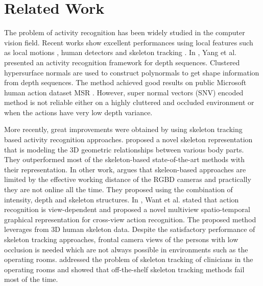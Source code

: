 
\chapter{Related Work} %

\label{Chapter2} %



	The problem of activity recognition has been widely studied in the computer vision field. Recent works show excellent performances using local features such as local motions \cite{5995407, 6909503}, human detectors \cite{Klaser:2010:HFA:2435051.2435071} and skeleton tracking \cite{6909731, 6909476, 6909493}. In \cite{6909503}, Yang et al. presented an activity recognition framework for depth sequences. Clustered hypersurface normals are used to construct polynormals to get shape information from depth sequences. The method achieved good results on public Microsoft human action dataset MSR \cite{MSR:5543273, MSR:6618942, MSR:Wang:2012:RAR:2403006.2403071, MSR:6247813}. However, super normal vectors (SNV) encoded method is not reliable either on a highly cluttered and occluded environment or when the actions have very low depth variance.

	More recently, great improvements were obtained by using skeleton tracking based activity recognition approaches. \citet{6909476} proposed a novel skeleton representation that is modeling the 3D geometric relationships between various body parts. They outperformed most of the skeleton-based state-of-the-art methods with their representation. In other work, \citet{6909731} argues that skeleon-based approaches are limited by the effective working distance of the RGBD cameras and practically they are not online all the time. They proposed using the combination of intensity, depth and skeleton structures. In \cite{6909735}, Want et al. stated that action recognition is view-dependent and proposed a novel multiview spatio-temporal graphical representation for cross-view action recognition. The proposed method leverages from 3D human skeleton data. Despite the satisfactory performance of skeleton tracking approaches, frontal camera views of the persons with low occlusion is needed which are not always possible in environments such as the operating rooms. \citet{RahimKinectOR} addressed the problem of skeleton tracking of clinicians in the operating rooms and showed that off-the-shelf skeleton tracking methods fail most of the time.
    
